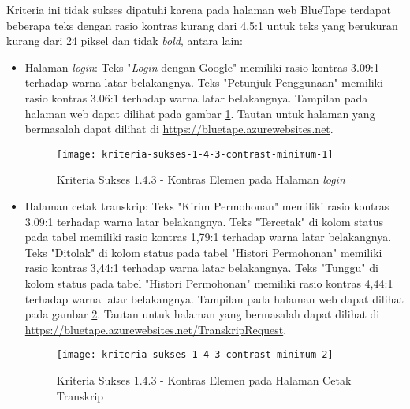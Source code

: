 Kriteria ini tidak sukses dipatuhi karena pada halaman web BlueTape terdapat beberapa teks dengan rasio kontras kurang dari 4,5:1 untuk teks yang berukuran kurang dari 24 piksel dan tidak \textit{bold}, antara lain:

\begin{itemize}
    \item Halaman \textit{login}: Teks "\textit{Login} dengan Google" memiliki rasio kontras 3.09:1 terhadap warna latar belakangnya. Teks "Petunjuk Penggunaan" memiliki rasio kontras 3.06:1 terhadap warna latar belakangnya. Tampilan pada halaman web dapat dilihat pada gambar \ref{fig:1.4.3_contrast_minimum_1}. Tautan untuk halaman yang bermasalah dapat dilihat di \url{https://bluetape.azurewebsites.net}.
    \begin{figure}[H]
        \centering  
        \texttt{[image: kriteria-sukses-1-4-3-contrast-minimum-1]}  
        \caption[Kriteria Sukses 1.4.3 - Kontras Elemen pada Halaman \textit{login}]{Kriteria Sukses 1.4.3 - Kontras Elemen pada Halaman \textit{login}}
        \label{fig:1.4.3_contrast_minimum_1}  
    \end{figure} 
    
    \item Halaman cetak transkrip: Teks "Kirim Permohonan" memiliki rasio kontras 3.09:1 terhadap warna latar belakangnya. Teks "Tercetak" di kolom status pada tabel memiliki rasio kontras 1,79:1 terhadap warna latar belakangnya. Teks "Ditolak" di kolom status pada tabel "Histori Permohonan" memiliki rasio kontras 3,44:1 terhadap warna latar belakangnya. Teks "Tunggu" di kolom status pada tabel "Histori Permohonan" memiliki rasio kontras 4,44:1 terhadap warna latar belakangnya. Tampilan pada halaman web dapat dilihat pada gambar \ref{fig:1.4.3_contrast_minimum_2}. Tautan untuk halaman yang bermasalah dapat dilihat di \url{https://bluetape.azurewebsites.net/TranskripRequest}.
    \begin{figure}[H]
        \centering  
        \texttt{[image: kriteria-sukses-1-4-3-contrast-minimum-2]}  
        \caption[Kriteria Sukses 1.4.3 - Kontras Elemen pada Halaman Cetak Transkrip]{Kriteria Sukses 1.4.3 - Kontras Elemen pada Halaman Cetak Transkrip}
        \label{fig:1.4.3_contrast_minimum_2}  
    \end{figure} 
    

\end{itemize}
